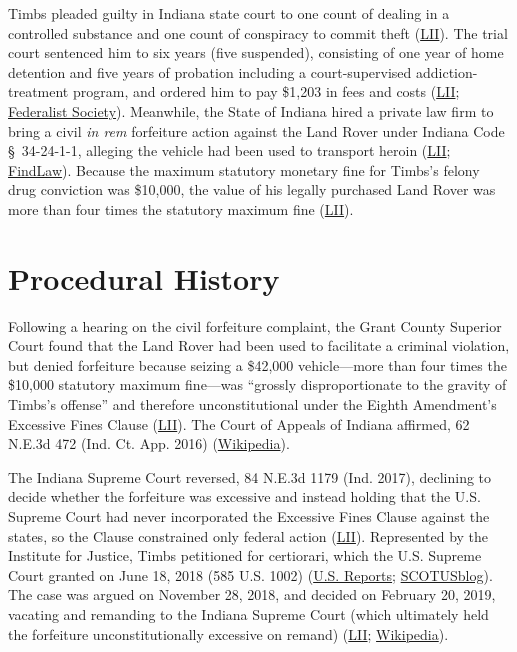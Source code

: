 \documentclass[12pt]{article}
\begin{document}
Timbs pleaded guilty in Indiana state court to one count of dealing in a controlled substance and one count of conspiracy to commit theft (\href{https://www.law.cornell.edu/supremecourt/text/17-1091}{LII}). The trial court sentenced him to six years (five suspended), consisting of one year of home detention and five years of probation including a court-supervised addiction-treatment program, and ordered him to pay \$1,203 in fees and costs (\href{https://www.law.cornell.edu/supremecourt/text/17-1091}{LII}; \href{https://fedsoc.org/case/timbs-v-indiana}{Federalist Society}). Meanwhile, the State of Indiana hired a private law firm to bring a civil \textit{in rem} forfeiture action against the Land Rover under Indiana Code \S~34-24-1-1, alleging the vehicle had been used to transport heroin (\href{https://www.law.cornell.edu/supremecourt/text/17-1091}{LII}; \href{https://caselaw.findlaw.com/court/in-supreme-court/2028477.html}{FindLaw}). Because the maximum statutory monetary fine for Timbs's felony drug conviction was \$10,000, the value of his legally purchased Land Rover was more than four times the statutory maximum fine (\href{https://www.law.cornell.edu/supremecourt/text/17-1091}{LII}).

\section{Procedural History}

Following a hearing on the civil forfeiture complaint, the Grant County Superior Court found that the Land Rover had been used to facilitate a criminal violation, but denied forfeiture because seizing a \$42,000 vehicle---more than four times the \$10,000 statutory maximum fine---was ``grossly disproportionate to the gravity of Timbs's offense'' and therefore unconstitutional under the Eighth Amendment's Excessive Fines Clause (\href{https://www.law.cornell.edu/supremecourt/text/17-1091}{LII}). The Court of Appeals of Indiana affirmed, 62 N.E.3d 472 (Ind. Ct. App. 2016) (\href{https://en.wikipedia.org/wiki/Timbs_v._Indiana}{Wikipedia}).

The Indiana Supreme Court reversed, 84 N.E.3d 1179 (Ind. 2017), declining to decide whether the forfeiture was excessive and instead holding that the U.S. Supreme Court had never incorporated the Excessive Fines Clause against the states, so the Clause constrained only federal action (\href{https://www.law.cornell.edu/supremecourt/text/17-1091}{LII}). Represented by the Institute for Justice, Timbs petitioned for certiorari, which the U.S. Supreme Court granted on June 18, 2018 (585 U.S. 1002) (\href{https://www.govinfo.gov/content/pkg/USREPORTS-586/pdf/USREPORTS-586-146.pdf}{U.S. Reports}; \href{https://www.scotusblog.com/cases/timbs-v-indiana/}{SCOTUSblog}). The case was argued on November 28, 2018, and decided on February 20, 2019, vacating and remanding to the Indiana Supreme Court (which ultimately held the forfeiture unconstitutionally excessive on remand) (\href{https://www.law.cornell.edu/supremecourt/text/17-1091}{LII}; \href{https://en.wikipedia.org/wiki/Timbs_v._Indiana}{Wikipedia}).
\end{document}
